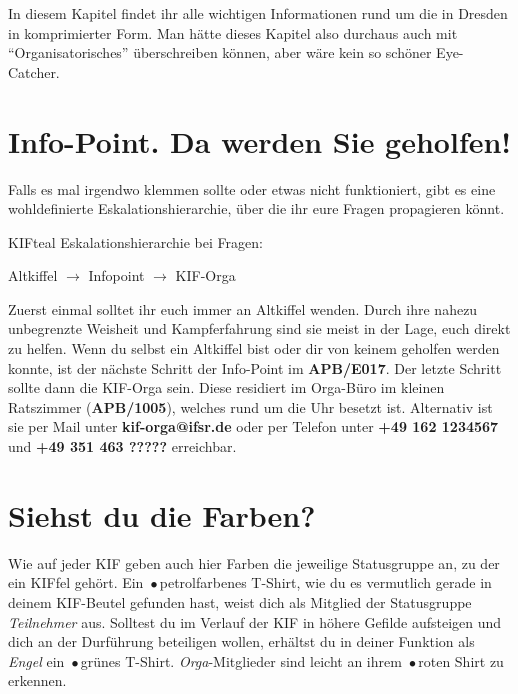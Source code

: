 
In diesem Kapitel findet ihr alle wichtigen Informationen rund um die \KIF{} in Dresden in komprimierter Form.
Man hätte dieses Kapitel also durchaus auch mit ``Organisatorisches'' überschreiben können, aber wäre kein so schöner Eye-Catcher.

\section*{Info-Point. Da werden Sie geholfen!}

Falls es mal irgendwo klemmen sollte oder etwas nicht funktioniert, gibt es eine wohldefinierte Eskalationshierarchie, über die ihr eure Fragen propagieren könnt.

\begin{awesomeblock}[KIFteal]{2pt}{\faQuestion}{KIFteal}
  Eskalationshierarchie bei Fragen:

  Altkiffel $\longrightarrow$ Infopoint $\longrightarrow$ KIF-Orga
\end{awesomeblock}

Zuerst einmal solltet ihr euch immer an Altkiffel wenden.
Durch ihre nahezu unbegrenzte Weisheit und Kampferfahrung sind sie meist in der Lage, euch direkt zu helfen.
Wenn du selbst ein Altkiffel bist oder dir von keinem geholfen werden konnte, ist der nächste Schritt der Info-Point im \textbf{APB/E017}.
Der letzte Schritt sollte dann die KIF-Orga sein.
Diese residiert im Orga-Büro im kleinen Ratszimmer (\textbf{APB/1005}), welches rund um die Uhr besetzt ist.
Alternativ ist sie per Mail unter \textbf{kif-orga@ifsr.de} oder per Telefon unter \textbf{+49 162 1234567} und \textbf{+49 351 463 ?????} erreichbar.

\section*{Siehst du die Farben?}

Wie auf jeder KIF geben auch hier Farben die jeweilige Statusgruppe an, zu der ein KIFfel gehört.
Ein {\,\color{ShirtAttendee}$\bullet$\,}petrolfarbenes T-Shirt, wie du es vermutlich gerade in deinem KIF-Beutel gefunden hast, weist dich als Mitglied der Statusgruppe \emph{Teilnehmer} aus.
Solltest du im Verlauf der KIF in höhere Gefilde aufsteigen und dich an der Durführung beteiligen wollen, erhältst du in deiner Funktion als \emph{Engel} ein {\,\color{ShirtAngel}$\bullet$\,}grünes T-Shirt.
\emph{Orga}-Mitglieder sind leicht an ihrem {\,\color{ShirtOrga}$\bullet$\,}roten Shirt zu erkennen.

